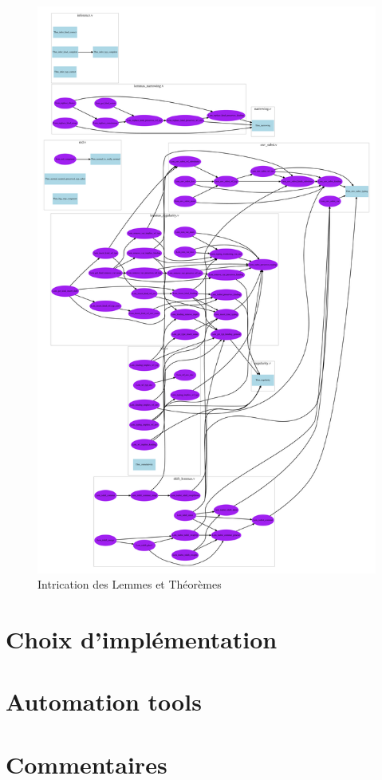 \documentclass[a4paper,10pt]{scrartcl}
\begin{document}
      \begin{figure}
      
      \noindent\includegraphics[width=0.9\linewidth]{../lol.pdf}
      \caption{Intrication des Lemmes et Théorèmes}
      \label{fig:graph}
      \end{figure}
      
     \section{Choix d'implémentation}
     
     \section{Automation tools}
     
     \section{Commentaires}
     
     

    
\end{document}
